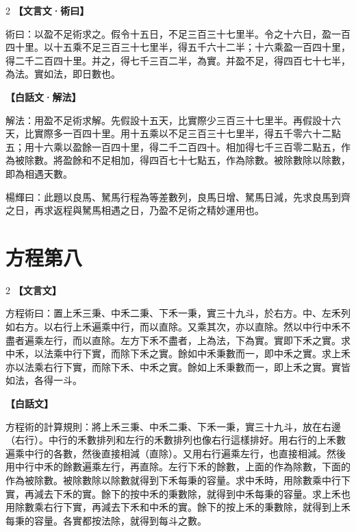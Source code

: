 \documentclass[11pt,a4paper]{article}
\newcommand{\zhc}{}[1]{{\CJKfamily{\CJKrmdefault}#1}}  %
\newcommand{\zhm}[1]{{\CJKfamily{\CJKrmdefault}#1}}  %
\newenvironment{prob bilingual}[1][]{%
  \begin{paracol}{2}%
  \setlength{\columnseprule}{0.4pt}%
}{%
  \end{paracol}%
  \medskip%
}
\begin{document}
\medskip

\begin{paracol}{2}
\switchcolumn[0]
\noindent\textbf{\textcolor{notecolor}{\zhc{【文言文·術曰】}}}\par\smallskip
\zhc{
術曰：以盈不足術求之。假令十五日，不足三百三十七里半。令之十六日，盈一百四十里。以十五乘不足三百三十七里半，得五千六十二半；十六乘盈一百四十里，得二千二百四十里。并之，得七千三百二半，為實。并盈不足，得四百七十七半，為法。實如法，即日數也。
}

\switchcolumn[1]
\noindent\textbf{\textcolor{notecolor}{\zhm{【白話文·解法】}}}\par\smallskip
\zhm{
解法：用盈不足術求解。先假設十五天，比實際少三百三十七里半。再假設十六天，比實際多一百四十里。用十五乘以不足三百三十七里半，得五千零六十二點五；用十六乘以盈餘一百四十里，得二千二百四十。相加得七千三百零二點五，作為被除數。將盈餘和不足相加，得四百七十七點五，作為除數。被除數除以除數，即為相遇天數。

楊輝曰：此題以良馬、駑馬行程為等差數列，良馬日增、駑馬日減，先求良馬到齊之日，再求返程與駑馬相遇之日，乃盈不足術之精妙運用也。
}
\end{paracol}

\newpage

\section{\zhc{方程第八}}
\label{sec:fangcheng}

\begin{paracol}{2}
\switchcolumn[0]
\noindent\textbf{\textcolor{notecolor}{\zhc{【文言文】}}}\par\smallskip
\zhc{
方程術曰：置上禾三秉、中禾二秉、下禾一秉，實三十九斗，於右方。中、左禾列如右方。以右行上禾遍乘中行，而以直除。又乘其次，亦以直除。然以中行中禾不盡者遍乘左行，而以直除。左方下禾不盡者，上為法，下為實。實即下禾之實。求中禾，以法乘中行下實，而除下禾之實。餘如中禾秉數而一，即中禾之實。求上禾亦以法乘右行下實，而除下禾、中禾之實。餘如上禾秉數而一，即上禾之實。實皆如法，各得一斗。
}

\switchcolumn[1]
\noindent\textbf{\textcolor{notecolor}{\zhm{【白話文】}}}\par\smallskip
\zhm{
方程術的計算規則：將上禾三秉、中禾二秉、下禾一秉，實三十九斗，放在右邊（右行）。中行的禾數排列和左行的禾數排列也像右行這樣排好。用右行的上禾數遍乘中行的各數，然後直接相減（直除）。又用右行遍乘左行，也直接相減。然後用中行中禾的餘數遍乘左行，再直除。左行下禾的餘數，上面的作為除數，下面的作為被除數。被除數除以除數就得到下禾每秉的容量。求中禾時，用除數乘中行下實，再減去下禾的實。餘下的按中禾的秉數除，就得到中禾每秉的容量。求上禾也用除數乘右行下實，再減去下禾和中禾的實。餘下的按上禾的秉數除，就得到上禾每秉的容量。各實都按法除，就得到每斗之數。
}
\end{paracol}
\end{document}
